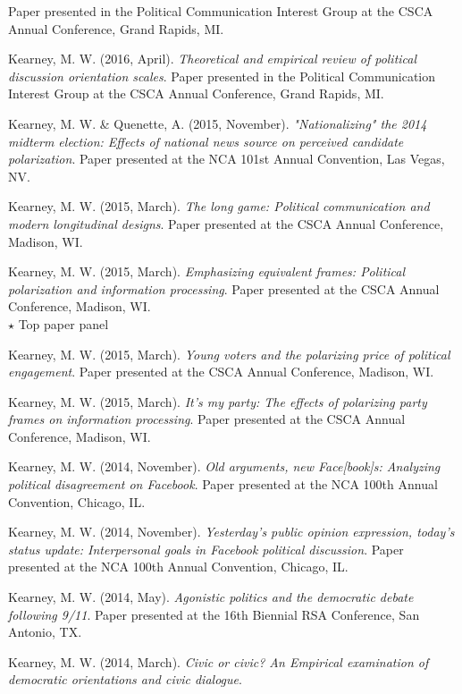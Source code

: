 \begin{bibenum}
      Paper presented in the Political Communication Interest Group at the CSCA Annual Conference, Grand Rapids, MI.
    \item[] Kearney, M. W. (2016, April).
      \textit{Theoretical and empirical review of political discussion orientation scales}.
      Paper presented in the Political Communication Interest Group at the CSCA Annual Conference, Grand Rapids, MI.
    \item[] Kearney, M. W. \& Quenette, A. (2015, November).
      \textit{"Nationalizing" the 2014 midterm election: Effects of national news source on perceived candidate polarization}.
      Paper presented at the NCA 101st Annual Convention, Las Vegas, NV.
    \item[] Kearney, M. W. (2015, March).
      \textit{The long game: Political communication and modern longitudinal designs}.
      Paper presented at the CSCA Annual Conference, Madison, WI.
    \item[] Kearney, M. W. (2015, March).
      \textit{Emphasizing equivalent frames: Political polarization and information processing}.
      Paper presented at the CSCA Annual Conference, Madison, WI.\\
      {$\star$} Top paper panel
    \item[] Kearney, M. W. (2015, March).
      \textit{Young voters and the polarizing price of political engagement}.
      Paper presented at the CSCA Annual Conference, Madison, WI.
    \item[] Kearney, M. W. (2015, March).
      \textit{It's my party: The effects of polarizing party frames on information processing}.
      Paper presented at the CSCA Annual Conference, Madison, WI.
    \item[] Kearney, M. W. (2014, November).
      \textit{Old arguments, new Face[book]s: Analyzing political disagreement on Facebook}.
      Paper presented at the NCA 100th Annual Convention, Chicago, IL.
    \item[] Kearney, M. W. (2014, November).
      \textit{Yesterday's public opinion expression, today's status update: Interpersonal goals in Facebook political discussion}.
      Paper presented at the NCA 100th Annual Convention, Chicago, IL.
    \item[] Kearney, M. W. (2014, May).
      \textit{Agonistic politics and the democratic debate following 9/11}.
      Paper presented at the 16th Biennial RSA Conference, San Antonio, TX.
    \item[] Kearney, M. W. (2014, March).
      \textit{Civic or civic? An Empirical examination of democratic orientations and civic dialogue}.

\end{bibenum}
